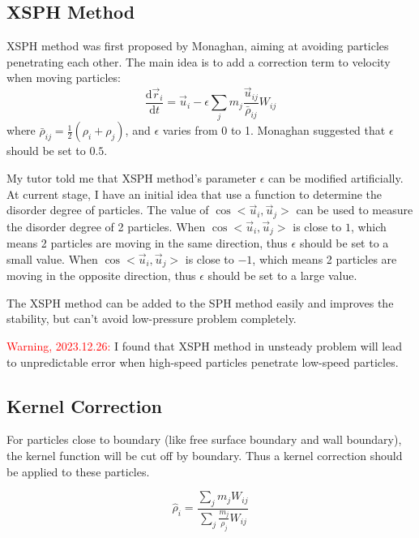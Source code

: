 \subsection{XSPH Method}

XSPH method was first proposed by Monaghan,
aiming at avoiding particles penetrating each other.
The main idea is to add a correction term to velocity when moving particles:
\begin{equation}
    \frac{\mathrm{d}\vec{r}_i}{\mathrm{d}t} = \vec{u}_i - \epsilon \sum_j m_j \frac{\vec{u}_{ij}}{\bar{\rho}_{ij}} W_{ij}
\end{equation}
where $\bar{\rho}_{ij} = \frac{1}{2}(\rho_i + \rho_j)$,
and $\epsilon$ varies from 0 to 1.
Monaghan suggested that $\epsilon$ should be set to $0.5$.

My tutor told me that XSPH method's parameter $\epsilon$ can be modified artificially.
At current stage, I have an initial idea that use a function to determine the 
disorder degree of particles.
The value of $\cos<\vec{u}_i, \vec{u}_j>$ can be used to measure the disorder degree of 2 particles.
When $\cos<\vec{u}_i, \vec{u}_j>$ is close to $1$, 
which means 2 particles are moving in the same direction, 
thus $\epsilon$ should be set to a small value.
When $\cos<\vec{u}_i, \vec{u}_j>$ is close to $-1$,
which means 2 particles are moving in the opposite direction,
thus $\epsilon$ should be set to a large value.

The XSPH method can be added to the SPH method easily and improves the stability,
but can't avoid low-pressure problem completely.

\textcolor{red}{Warning, 2023.12.26:} I found that XSPH method in unsteady problem will lead to
unpredictable error when high-speed particles penetrate low-speed particles.

\subsection{Kernel Correction}

For particles close to boundary (like free surface boundary and wall boundary),
the kernel function will be cut off by boundary.
Thus a kernel correction should be applied to these particles.

\begin{figure}[H]
    \centering
\end{figure}
\begin{equation}
    \hat{\rho}_i = \frac{
        \sum_j m_j W_{ij}
    }{
        \sum_j \frac{m_j}{\rho_j}W_{ij}
    }
\end{equation}

